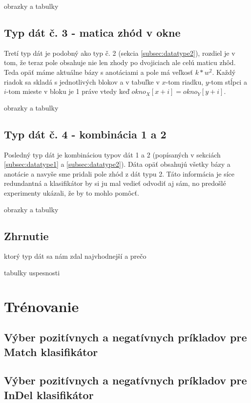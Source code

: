 \todo obrazky a tabulky

\subsection{Typ dát č. 3 - matica zhód v okne}

Tretí typ dát je podobný ako typ č. 2 (sekcia \ref{subsec:datatype2}), rozdiel je v tom, že teraz pole obsahuje nie len zhody po dvojiciach ale celú maticu zhôd. Teda opäť máme aktuálne bázy s anotáciami a pole má veľkosť $k*w^2$. Každý riadok sa skladá s jednotlivých blokov a v tabuľke v $x$-tom riadku, $y$-tom stĺpci a $i$-tom mieste v bloku je 1 práve
vtedy keď $okno_X[x+i] = okno_Y[y+i]$.

\todo obrazky a tabulky

\subsection{Typ dát č. 4 - kombinácia 1 a 2}

Posledný typ dát je kombináciou typov dát 1 a 2 (popísaných v sekciách \ref{subsec:datatype1} a \ref{subsec:datatype2}). Dáta opäť obsahujú všetky bázy a anotácie a navyše sme pridali pole zhód z dát typu 2. Táto informácia je síce redundantná a klasifikátor by si ju mal vedieť odvodiť aj sám, no predošlé experimenty ukázali, že by to mohlo pomôcť.

\todo obrazky a tabulky

\subsection{Zhrnutie}

\todo ktorý typ dát sa nám zdal najvhodnejší a prečo

\todo tabulky uspesnosti


\section{Trénovanie}

\subsection{Výber pozitívnych a negatívnych príkladov pre Match klasifikátor}

\subsection{Výber pozitívnych a negatívnych príkladov pre InDel klasifikátor}






